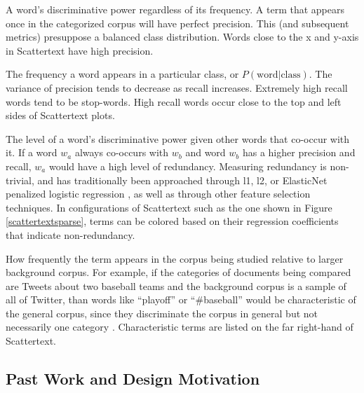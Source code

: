 \documentclass[11pt]{article}
\begin{document}
\begin{description}[style=unboxed,leftmargin=0cm]
\item[Precision] A word's discriminative power regardless of its frequency.  A term that appears once in the categorized corpus will have perfect precision. This (and subsequent metrics) presuppose a balanced class distribution.  Words close to the x and y-axis in Scattertext have high precision.  \vspace{-0.1in}
\item[Recall] The frequency a word appears in a particular class, or $P(\mbox{word}|\mbox{class})$.  The variance of precision tends to decrease as recall increases.  Extremely high recall words tend to be stop-words.  High recall words occur close to the top and left sides of Scattertext plots.  \vspace{-0.1in}
\item[Non-redundancy] The level of a word's discriminative power given other words that co-occur with it.  If a word $w_a$ always co-occurs with $w_b$ and word $w_b$ has a higher precision and recall, $w_a$ would have a high level of redundancy. Measuring redundancy is non-trivial, and has traditionally been approached through l1, l2, or ElasticNet penalized logistic regression \cite{joshi2010}, as well as through other feature selection techniques.  In configurations of Scattertext such as the one shown in Figure \ref{scattertextsparse}, terms can be colored based on their regression coefficients that indicate non-redundancy.  \vspace{-0.1in}

\item[Characteristicness] How frequently the term appears in the corpus being studied relative to larger background corpus.  For example, if the categories of documents being compared are Tweets about two baseball teams and the background corpus is a sample of all of Twitter, than words like ``playoff'' or ``\#baseball'' would be characteristic of the general corpus, since they discriminate the corpus in general but not necessarily one category \cite{vennclouds}.  Characteristic terms are listed on the far right-hand of Scattertext. \vspace{-0.1in}
\end{description}

\subsection{Past Work and Design Motivation}
\end{document}
